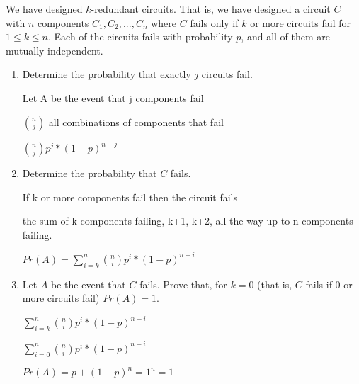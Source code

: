 \documentclass[12pt]{article}
\newcounter{ques}
\newenvironment{question}{\stepcounter{ques}{\noindent\bf Question \arabic{ques}:}}{\vspace{5mm}}
\begin{document}
\begin{question}
	We have designed $k$-redundant circuits. That is, we have designed a circuit $C$ with $n$ components $C_1,C_2,...,C_n$ where $C$ fails only if $k$ or more circuits fail for $1\leq k\leq n$. Each of the circuits fails with probability $p$, and all of them are mutually independent.
	\begin{enumerate}
		\item Determine the probability that exactly $j$ circuits fail.
		
		Let A be the event that j components fail

		$n \choose j$ all combinations of components that fail

		${n \choose j}p^j * (1-p)^{n-j}$

		\item Determine the probability that $C$ fails. 
		
		If k or more components fail then the circuit fails

		the sum of k components failing, k+1, k+2, all the way up to n components failing.

		$Pr(A) = \sum_{i=k}^{n} {n \choose i}p^i * (1-p)^{n-i}$


	\item Let $A$ be the event that $C$ fails. Prove that, for $k=0$ (that is, $C$ fails if $0$ or more circuits fail) $Pr(A)=1$.  
	
	$\sum_{i=k}^{n} {n \choose i}p^i * (1-p)^{n-i}$

	$\sum_{i=0}^{n} {n \choose i}p^i * (1-p)^{n-i}$

	$Pr(A) = p+(1-p)^{n} = 1^n = 1$

	\end{enumerate}
\end{question}
\end{document}
